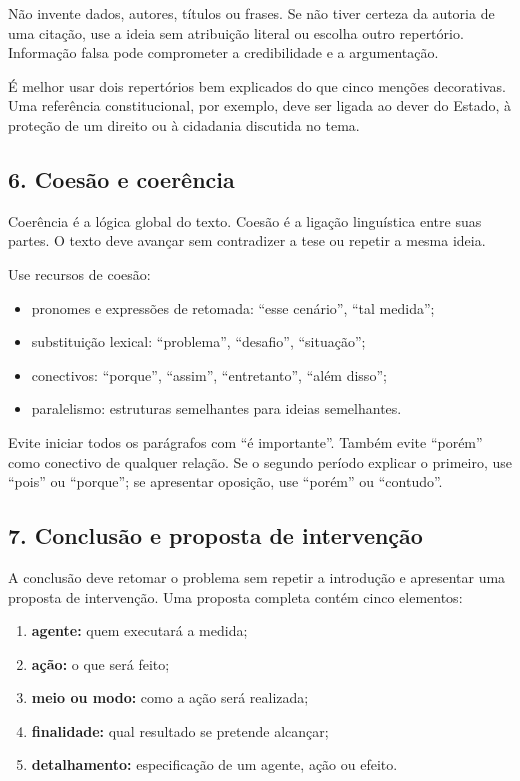 \documentclass[11pt,a4paper]{article}
\begin{document}
Não invente dados, autores, títulos ou frases. Se não tiver certeza da autoria de uma citação, use a ideia sem atribuição literal ou escolha outro repertório. Informação falsa pode comprometer a credibilidade e a argumentação.

É melhor usar dois repertórios bem explicados do que cinco menções decorativas. Uma referência constitucional, por exemplo, deve ser ligada ao dever do Estado, à proteção de um direito ou à cidadania discutida no tema.

\subsection*{6. Coesão e coerência}

Coerência é a lógica global do texto. Coesão é a ligação linguística entre suas partes. O texto deve avançar sem contradizer a tese ou repetir a mesma ideia.

Use recursos de coesão:

\begin{itemize}
  \item pronomes e expressões de retomada: “esse cenário”, “tal medida”;
  \item substituição lexical: “problema”, “desafio”, “situação”;
  \item conectivos: “porque”, “assim”, “entretanto”, “além disso”;
  \item paralelismo: estruturas semelhantes para ideias semelhantes.
\end{itemize}

Evite iniciar todos os parágrafos com “é importante”. Também evite “porém” como conectivo de qualquer relação. Se o segundo período explicar o primeiro, use “pois” ou “porque”; se apresentar oposição, use “porém” ou “contudo”.

\subsection*{7. Conclusão e proposta de intervenção}

A conclusão deve retomar o problema sem repetir a introdução e apresentar uma proposta de intervenção. Uma proposta completa contém cinco elementos:

\begin{enumerate}
  \item \textbf{agente:} quem executará a medida;
  \item \textbf{ação:} o que será feito;
  \item \textbf{meio ou modo:} como a ação será realizada;
  \item \textbf{finalidade:} qual resultado se pretende alcançar;
  \item \textbf{detalhamento:} especificação de um agente, ação ou efeito.
\end{enumerate}
\end{document}
